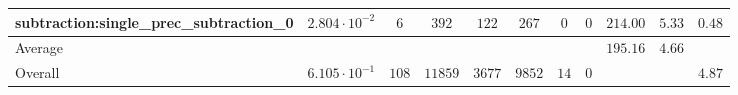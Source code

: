 \begin{tabular}{|l|c|c|c|c|c|c|c|c|c|c|}
subtraction:single\_prec\_subtraction\_0         & $ 2.804 \cdot 10^{-2} $ & $ 6      $ & $ 392   $ & $ 122  $ & $ 267   $ & $ 0  $ & $ 0 $ & $ 214.00      $ & $ 5.33    $ & $ 0.48    $ \\
\hline
Average                                          & $                     $ & $        $ & $       $ & $      $ & $       $ & $    $ & $   $ & $ 195.16      $ & $ 4.66    $ & $         $ \\
\hline
Overall                                          & $ 6.105 \cdot 10^{-1} $ & $ 108    $ & $ 11859 $ & $ 3677 $ & $ 9852  $ & $ 14 $ & $ 0 $ & $             $ & $         $ & $ 4.87    $ \\
\hline
\end{tabular}
